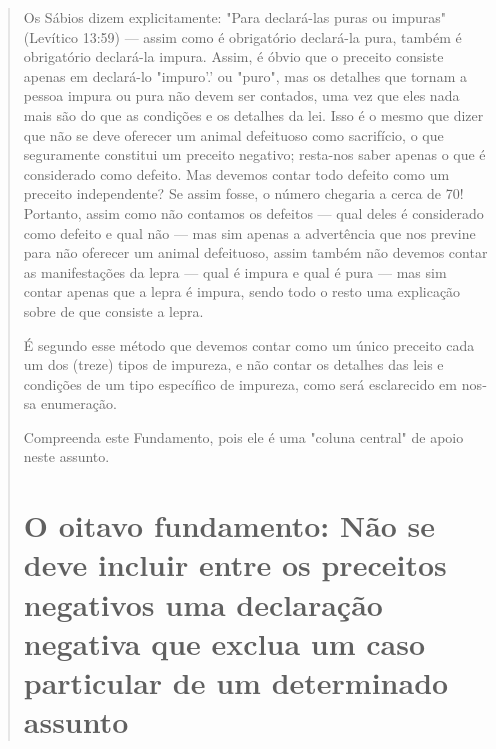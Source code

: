 \begin{quote}
Os Sábios dizem explicitamente: "Para declará-las puras ou impuras"
(Levítico 13:59) --- assim como é obrigatório declará-la pura, também é
obriga­tório declará-la impura. Assim, é óbvio que o preceito consiste
apenas em declará-lo "impuro'.' ou "puro", mas os detalhes que tornam a
pessoa impura ou pura não devem ser contados, uma vez que eles nada mais
são do que as condições e os detalhes da lei. Isso é o mesmo que dizer
que não se deve ofere­cer um animal defeituoso como sacrifício, o que
seguramente constitui um pre­ceito negativo; resta-nos saber apenas o
que é considerado como defeito. Mas devemos contar todo defeito como um
preceito independente? Se assim fosse, o número chegaria a cerca de 70!
Portanto, assim como não contamos os defei­tos --- qual deles é
considerado como defeito e qual não --- mas sim apenas a advertência que
nos previne para não oferecer um animal defeituoso, assim tam­bém não
devemos contar as manifestações da lepra --- qual é impura e qual é pura
--- mas sim contar apenas que a lepra é impura, sendo todo o resto uma
explicação sobre de que consiste a lepra.

É segundo esse método que devemos contar como um único pre­ceito cada um
dos (treze) tipos de impureza, e não contar os detalhes das leis e
condições de um tipo específico de impureza, como será esclarecido em
nos­sa enumeração.

Compreenda este Fundamento, pois ele é uma "coluna central" de apoio
neste assunto.

\chapter{O oitavo fundamento: Não se deve incluir entre os preceitos negativos uma declaração negativa que exclua um caso particular de um determinado assunto}


\end{quote}
